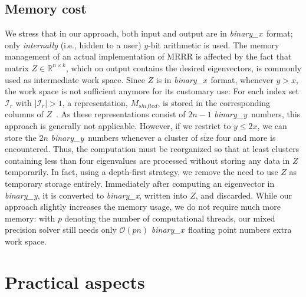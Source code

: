 \documentclass[final]{siamltex}
\newcommand{\binaryx}{{\it binary\_\hspace*{1pt}x}}
\newcommand{\binaryy}{{\it binary\_\hspace*{0pt}y}}
\begin{document}
\subsection{Memory cost}
\label{sec:memcost}

We stress that in our approach, both input and output are in \binaryx\
format; only {\it internally} (i.e., hidden to a user) $y$-bit
arithmetic is used.
The memory management of an actual implementation of MRRR is affected by the
fact that matrix $Z \in \mathbb{R}^{n \times k}$, which on output contains
the desired eigenvectors, 
is commonly used as intermediate work space. Since $Z$ is in \binaryx\ format, whenever $y >
x$, the work space is not sufficient anymore for its customary use: For
each index set $\mathcal{I}_r$ with $|\mathcal{I}_r| > 1$, a
representation, $M_{shifted}$, is stored in the corresponding columns of
$Z$~\cite{DesignMRRR,mr3smp}. 
As these representations consist of $2n-1$ \binaryy\ numbers, this approach
is generally not applicable. However, if we restrict to $y \leq 2x$, we can store the 2$n$ 
\binaryy\ numbers whenever a cluster of size four and more is encountered. Thus, the computation
must be reorganized so that at least clusters containing less than four
eigenvalues are processed without storing any data in $Z$ temporarily. In
fact, using a depth-first strategy, we remove the need to use $Z$ as
temporary storage entirely. 
Immediately after computing an eigenvector
in \binaryy, it is converted to \binaryx, written into $Z$, and
discarded. While our approach slightly increases the memory usage, we
do not require much more memory: with $p$ denoting the number of computational
threads, our mixed precision solver still needs only $\mathcal{O}(p n)$
\binaryx\ floating point numbers extra work space.  


\section{Practical aspects}
\label{sec:implementation}
\end{document}

